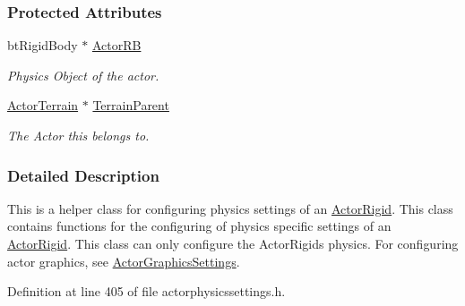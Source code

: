 \subsubsection*{Protected Attributes}
\begin{DoxyCompactItemize}
\item 
\hypertarget{classMezzanine_1_1ActorTerrainPhysicsSettings_a00d8b336e7444b6d3cfbc12798249503}{
btRigidBody $\ast$ \hyperlink{classMezzanine_1_1ActorTerrainPhysicsSettings_a00d8b336e7444b6d3cfbc12798249503}{ActorRB}}
\label{classMezzanine_1_1ActorTerrainPhysicsSettings_a00d8b336e7444b6d3cfbc12798249503}

\begin{DoxyCompactList}\small\item\em Physics Object of the actor. \item\end{DoxyCompactList}\item 
\hypertarget{classMezzanine_1_1ActorTerrainPhysicsSettings_af06a01b6f14c0a1ea1f96e3c56c0280e}{
\hyperlink{classMezzanine_1_1ActorTerrain}{ActorTerrain} $\ast$ \hyperlink{classMezzanine_1_1ActorTerrainPhysicsSettings_af06a01b6f14c0a1ea1f96e3c56c0280e}{TerrainParent}}
\label{classMezzanine_1_1ActorTerrainPhysicsSettings_af06a01b6f14c0a1ea1f96e3c56c0280e}

\begin{DoxyCompactList}\small\item\em The Actor this belongs to. \item\end{DoxyCompactList}\end{DoxyCompactItemize}


\subsubsection{Detailed Description}
This is a helper class for configuring physics settings of an \hyperlink{classMezzanine_1_1ActorRigid}{ActorRigid}. This class contains functions for the configuring of physics specific settings of an \hyperlink{classMezzanine_1_1ActorRigid}{ActorRigid}. This class can only configure the ActorRigids physics. For configuring actor graphics, see \hyperlink{classMezzanine_1_1ActorGraphicsSettings}{ActorGraphicsSettings}. 

Definition at line 405 of file actorphysicssettings.h.



